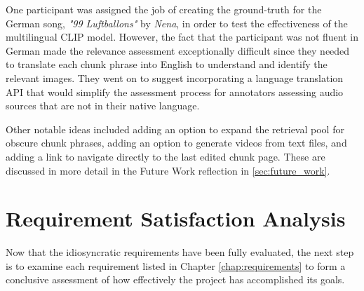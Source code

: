 \documentclass{l4proj}
\begin{document}
One participant was assigned the job of creating the ground-truth for the German song, \emph{"99 Luftballons"} by \emph{Nena}, in order to test the effectiveness of the multilingual CLIP model. However, the fact that the participant was not fluent in German made the relevance assessment exceptionally difficult since they needed to translate each chunk phrase into English to understand and identify the relevant images. They went on to suggest incorporating a language translation API that would simplify the assessment process for annotators assessing audio sources that are not in their native language.

Other notable ideas included adding an option to expand the retrieval pool for obscure chunk phrases, adding an option to generate videos from text files, and adding a link to navigate directly to the last edited chunk page. These are discussed in more detail in the Future Work reflection in \ref{sec:future_work}.


\section{Requirement Satisfaction Analysis}
Now that the idiosyncratic requirements have been fully evaluated, the next step is to examine each requirement listed in Chapter \ref{chap:requirements} to form a conclusive assessment of how effectively the project has accomplished its goals.
\end{document}
